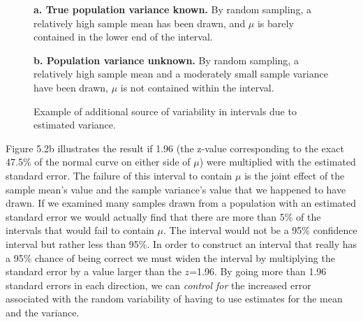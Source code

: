 \documentclass[12pt]{article}
\begin{document}
\begin{figure}[ht]
\centering

\textbf{a. True population variance known.} By random sampling, a relatively high sample mean has been drawn, and $\mu$ is barely contained in the lower end of the interval.

\vspace{0.5em}


\vspace{1em}


\vspace{0.5em}

\textbf{b. Population variance unknown.} By random sampling, a relatively high sample mean and a moderately small sample variance have been drawn, $\mu$ is not contained within the interval.

\caption{Example of additional source of variability in intervals due to estimated variance.}
\label{fig:5.2}
\end{figure}

\newpage


Figure 5.2b illustrates the result if 1.96 (the z-value corresponding to the exact 47.5\% of the normal curve on either side of $\mu$) were multiplied with the estimated standard error. The failure of this interval to contain $\mu$ is the joint effect of the sample mean's value and the sample variance's value that we happened to have drawn. If we examined many samples drawn from a population with an estimated standard error we would actually find that there are more than 5\% of the intervals that would fail to contain $\mu$. The interval would not be a 95\% confidence interval but rather less than 95\%. In order to construct an interval that really has a 95\% chance of being correct we must widen the interval by multiplying the standard error by a value larger than the $z$=1.96. By going more than 1.96 standard errors in each direction, we can \textit{control for} the increased error associated with the random variability of having to use estimates for the mean and the variance.
\end{document}
